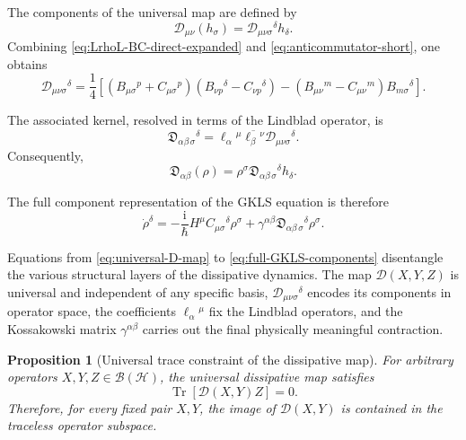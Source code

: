 \documentclass[notitlepage,aip,reprint,onecolumn]{revtex4-1}
\newtheorem{proposition}[theorem]{Proposition}
\theoremstyle{definition}
\begin{document}
The components of the universal map are defined by
\begin{equation}\label{eq:universal-D-components-def}
    \mathcal D_{\mu\nu}(h_\sigma)
    =
    \mathcal D_{\mu\nu\sigma}{}^\delta h_\delta.
\end{equation}
Combining \eqref{eq:LrhoL-BC-direct-expanded} and
\eqref{eq:anticommutator-short}, one obtains
\begin{equation}\label{eq:universal-D-components}
    \mathcal D_{\mu\nu\sigma}{}^\delta
    =
    \frac14
    \left[
    \left(
    B_{\mu\sigma}{}^p
    +
    C_{\mu\sigma}{}^p
    \right)
    \left(
    B_{\nu p}{}^\delta
    -
    C_{\nu p}{}^\delta
    \right)
    -
    \left(
    B_{\mu\nu}{}^m
    -
    C_{\mu\nu}{}^m
    \right)
    B_{m\sigma}{}^\delta
    \right].
\end{equation}

The associated kernel, resolved in terms of the Lindblad operator, is
\begin{equation}\label{eq:frakD-final}
    \mathfrak{D}_{\alpha\beta\,\sigma}{}^\delta
    =
    \ell_\alpha{}^\mu
    \overline{\ell_\beta{}^\nu}
    \mathcal D_{\mu\nu\sigma}{}^\delta.
\end{equation}
Consequently,
\[
    \mathfrak{D}_{\alpha\beta}(\rho)
    =
    \rho^\sigma
    \mathfrak{D}_{\alpha\beta\,\sigma}{}^\delta h_\delta.
\]

The full component representation of the GKLS equation is therefore
\begin{equation}\label{eq:full-GKLS-components}
    \dot\rho^\delta
    =
    -\frac{\mathrm{i}}{\hbar}
    H^\mu C_{\mu\sigma}{}^\delta\rho^\sigma
    +
    \gamma^{\alpha\beta}
    \mathfrak{D}_{\alpha\beta\,\sigma}{}^\delta\rho^\sigma.
\end{equation}

Equations from \eqref{eq:universal-D-map} to \eqref{eq:full-GKLS-components} disentangle the various structural layers of the dissipative dynamics. The map \(\mathcal D(X,Y,Z)\) is universal and independent of any specific basis, \(\mathcal D_{\mu\nu\sigma}{}^\delta\) encodes its components in operator space, the coefficients \(\ell_\alpha{}^\mu\) fix the Lindblad operators, and the Kossakowski matrix \(\gamma^{\alpha\beta}\) carries out the final physically meaningful contraction.

\begin{proposition}[Universal trace constraint of the dissipative map]
For arbitrary operators \(X,Y,Z\in\mathcal B(\mathcal H)\), the universal dissipative map satisfies
\begin{equation}\label{eq:universal-trace-constraint}
    \operatorname{Tr}\!\left[
    \mathcal D(X,Y)Z
    \right]
    =
    0.
\end{equation}
Therefore, for every fixed pair \(X,Y\), the image of \(\mathcal D(X,Y)\) is contained in the traceless operator subspace.
\end{proposition}
\end{document}
